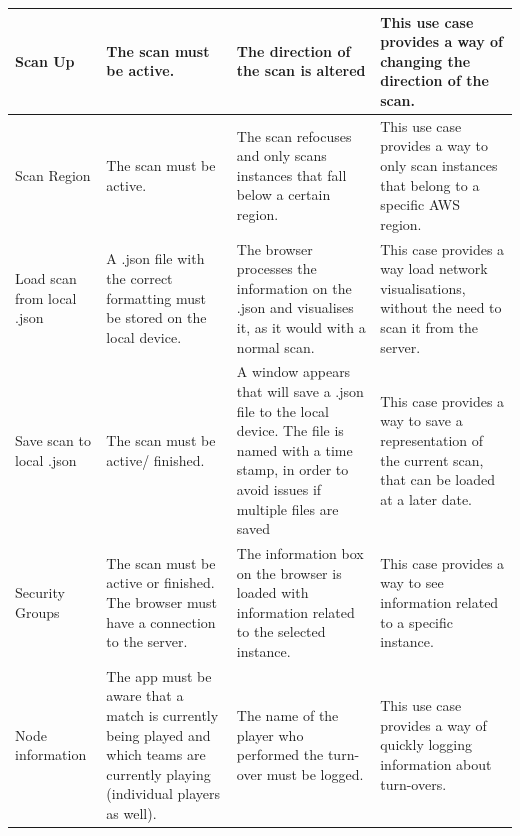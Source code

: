 \documentclass[a4paper,12pt]{report}
\begin{document}
\begin{center}
\begin{longtable}{| p{3cm} | p{4cm} | p{4cm} | p{4cm} |}
	Scan Up & The scan must be active. & The direction of the scan is altered & This use case provides a way of changing the direction of the scan.\\ \hline
    Scan Region & The scan must be active. & The scan refocuses and only scans instances that fall below a certain region. & This use case provides a way to only scan instances that belong to a specific AWS region.\\ \hline
    Load scan from local .json & A .json file with the correct formatting must be stored on the local device. & The browser processes the information on the .json and visualises it, as it would with a normal scan. & This case provides a way load network visualisations, without the need to scan it from the server.\\ \hline
    Save scan to local .json & The scan must be active/ finished. & A window appears that will save a .json file to the local device. The file is named with a time stamp, in order to avoid issues if multiple files are saved & This case provides a way to save a representation of the current scan, that can be loaded at a later date.\\ \hline
    Security Groups & The scan must be active or finished. The browser must have a connection to the server. & The information box on the browser is loaded with information related to the selected instance. &  This case provides a way to see information related to a specific instance.\\ \hline
    Node information & The app must be aware that a match is currently being played and which teams are currently playing (individual players as well). & The name of the player who performed the turn-over must be logged. &  This use case provides a way of quickly logging information about turn-overs.\\ \hline
    

    \hline
  \end{longtable}
\end{center}
\newpage
\end{document}
